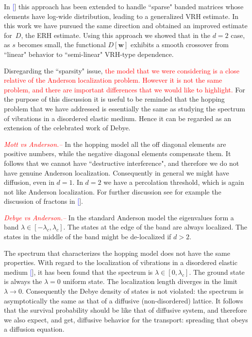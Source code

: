 \documentclass[aps,prb,floats,floatfix,twocolumn]{revtex4}
\newcommand{\rmrk}[1]{\textcolor{red}{#1}}
\renewcommand{\cite}[1]{\textcolor{blue}{[\onlinecite{#1}}]} %
\begin{document}
In \cite{kbd,kbw,slk} this approach has been extended 
to handle ``sparse" banded matrices whose elements have 
log-wide distribution, leading to a generalized VRH estimate. 
In this work we have pursued the same direction and obtained an 
improved estimate for~$D$, the ERH estimate.
Using this approach we showed that in the $d{=}2$ case, 
as $s$ becomes small, the functional $D[\bm{w}]$ exhibits 
a smooth crossover from ``linear" behavior to ``semi-linear" VRH-type dependence.  

Disregarding the ``sparsity" issue, \rmrk{the model that we were considering 
is a close relative of the Anderson localization problem.
However it is not the same problem, and there are important 
differences that we would like to highlight.}
For the purpose of this discussion it is useful to be reminded 
that the hopping problem that we have addressed is essentially 
the same as studying the spectrum of vibrations in 
a disordered elastic medium. Hence it can be regarded as 
an extension of the celebrated work of Debye.


\rmrk{{\em Mott vs Anderson.-- }}
In the hopping model all the off diagonal elements are positive numbers, 
while the negative diagonal elements compensate them.
It follows that we cannot have ``destructive interference", 
and therefore we do not have genuine Anderson localization. 
Consequently in general we might have diffusion, even in $d{=}1$. 
%
In $d{=}2$ we have a percolation threshold, which is again 
not like Anderson localization. For further discussion see 
for example the discussion of fractons in \cite{havlin}.


\rmrk{{\em Debye vs Anderson.-- }}
In the standard Anderson model the eigenvalues form 
a band ${\lambda \in [-\lambda_c,\lambda_c]}$.
The states at the edge of the band are always localized.
The states in the middle of the band might be de-localized if ${d>2}$.  

The spectrum that characterizes the hopping model does
not have the same properties. With regard to the 
localization of vibrations in a disordered elastic medium \cite{loc},  
it has been found that the spectrum is ${\lambda \in [0,\lambda_c]}$.
The ground state is always the ${\lambda=0}$ uniform state.
The localization length diverges in the limit ${\lambda \rightarrow 0}$.
Consequently the Debye density of states is not violated:
the spectrum is asymptotically the same as that of a 
diffusive (non-disordered) lattice. It follows that the 
survival probability should be like that of diffusive 
system, and therefore we also expect, and get, diffusive behavior
for the transport: spreading that obeys a diffusion equation.
\end{document}
